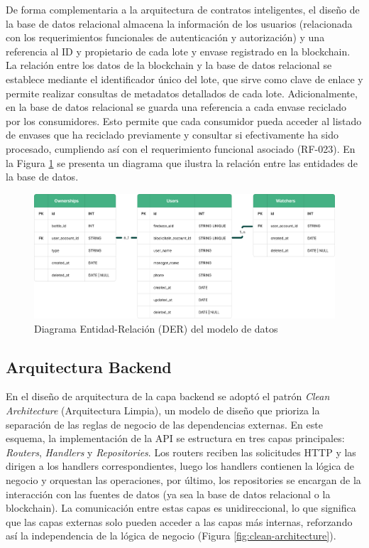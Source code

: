 De forma complementaria a la arquitectura de contratos inteligentes, el diseño de la base de datos relacional almacena la información de los usuarios (relacionada con los requerimientos funcionales de autenticación y autorización) y una referencia al ID y propietario de cada lote y envase registrado en la blockchain. La relación entre los datos de la blockchain y la base de datos relacional se establece mediante el identificador único del lote, que sirve como clave de enlace y permite realizar consultas de metadatos detallados de cada lote. Adicionalmente, en la base de datos relacional se guarda una referencia a cada envase reciclado por los consumidores. Esto permite que cada consumidor pueda acceder al listado de envases que ha reciclado previamente y consultar si efectivamente ha sido procesado, cumpliendo así con el requerimiento funcional asociado (RF-023). En la Figura \ref{fig:der} se presenta un diagrama que ilustra la relación entre las entidades de la base de datos.

\begin{figure}[!htb]
    \centering
    \includegraphics[width=\textwidth]{Figures/db-der.png}
    \caption{Diagrama Entidad-Relación (DER) del modelo de datos}
    \label{fig:der}
\end{figure}

\subsection{Arquitectura Backend}

En el diseño de arquitectura de la capa backend se adoptó el patrón \textit{Clean Architecture} (Arquitectura Limpia), un modelo de diseño que prioriza la separación de las reglas de negocio de las dependencias externas. En este esquema, la implementación de la API se estructura en tres capas principales: \textit{Routers}, \textit{Handlers} y \textit{Repositories}. Los routers reciben las solicitudes HTTP y las dirigen a los handlers correspondientes, luego los handlers contienen la lógica de negocio y orquestan las operaciones, por último, los repositories se encargan de la interacción con las fuentes de datos (ya sea la base de datos relacional o la blockchain). La comunicación entre estas capas es unidireccional, lo que significa que las capas externas solo pueden acceder a las capas más internas, reforzando así la independencia de la lógica de negocio (Figura \ref{fig:clean-architecture}).

